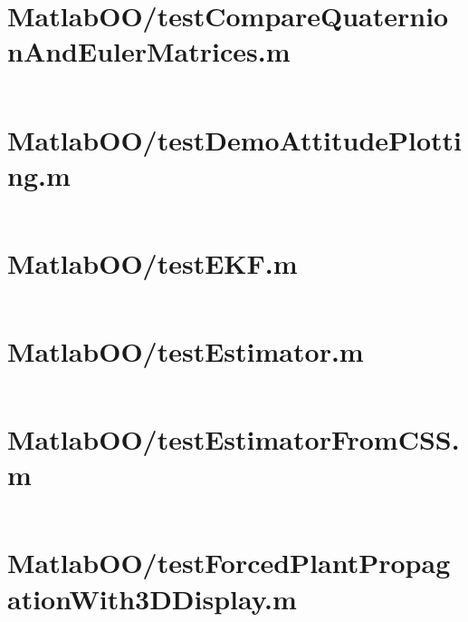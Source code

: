 \pagebreak
\section{MatlabOO/testCompareQuaternionAndEulerMatrices.m}\label{code:MatlabOO/testCompareQuaternionAndEulerMatrices.m}
\inputminted[linenos,fontsize=\scriptsize]{matlab}{/home/dcouture/git/mathyourlife/TSatPy/beta_versions/matlab_object_oriented/testCompareQuaternionAndEulerMatrices.m}

\pagebreak
\section{MatlabOO/testDemoAttitudePlotting.m}\label{code:MatlabOO/testDemoAttitudePlotting.m}
\inputminted[linenos,fontsize=\scriptsize]{matlab}{/home/dcouture/git/mathyourlife/TSatPy/beta_versions/matlab_object_oriented/testDemoAttitudePlotting.m}

\pagebreak
\section{MatlabOO/testEKF.m}\label{code:MatlabOO/testEKF.m}
\inputminted[linenos,fontsize=\scriptsize]{matlab}{/home/dcouture/git/mathyourlife/TSatPy/beta_versions/matlab_object_oriented/testEKF.m}

\pagebreak
\section{MatlabOO/testEstimator.m}\label{code:MatlabOO/testEstimator.m}
\inputminted[linenos,fontsize=\scriptsize]{matlab}{/home/dcouture/git/mathyourlife/TSatPy/beta_versions/matlab_object_oriented/testEstimator.m}

\pagebreak
\section{MatlabOO/testEstimatorFromCSS.m}\label{code:MatlabOO/testEstimatorFromCSS.m}
\inputminted[linenos,fontsize=\scriptsize]{matlab}{/home/dcouture/git/mathyourlife/TSatPy/beta_versions/matlab_object_oriented/testEstimatorFromCSS.m}

\pagebreak
\section{MatlabOO/testForcedPlantPropagationWith3DDisplay.m}\label{code:MatlabOO/testForcedPlantPropagationWith3DDisplay.m}
\inputminted[linenos,fontsize=\scriptsize]{matlab}{/home/dcouture/git/mathyourlife/TSatPy/beta_versions/matlab_object_oriented/testForcedPlantPropagationWith3DDisplay.m}

